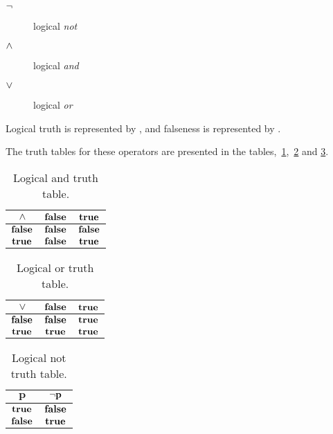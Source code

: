 \begin{description}
\item[$\neg$] logical \textit{not}
\item[$\wedge$] logical \textit{and}
\item[$\vee$] logical \textit{or}
\end{description}

Logical truth is represented by \True, and falseness is represented by
\False.

The truth tables for these operators are presented in the
tables,~\ref{tab:log-and-table},~\ref{tab:log-or-table} and
\ref{tab:log-not-table}.

\begin{table}
  \centering
  \begin{tabular}{|c|c|c|}
    \hline
    $\mathbf{\wedge}$ & $\mathbf{\textbf{false}}$ & $\mathbf{\textbf{true}}$ \\ \hline
    $\mathbf{\textbf{false}}$ & $\mathbf{\textbf{false}}$ & $\mathbf{\textbf{false}}$ \\ \hline
    $\mathbf{\textbf{true}}$ & $\mathbf{\textbf{false}}$ & $\mathbf{\textbf{true}}$ \\ \hline
  \end{tabular}
  \caption{Logical and truth table.}
  \label{tab:log-and-table}
\end{table}

\begin{table}
  \centering
  \begin{tabular}{|c|c|c|}
    \hline
    $\mathbf{\vee}$ & $\mathbf{\textbf{false}}$ & $\mathbf{\textbf{true}}$ \\ \hline
    $\mathbf{\textbf{false}}$ & $\textbf{false}$ & $\textbf{true}$ \\ \hline
    $\mathbf{\textbf{true}}$ & $\textbf{true}$ & $\textbf{true}$ \\ \hline
  \end{tabular}
  \caption{Logical or truth table.}
  \label{tab:log-or-table}
\end{table}

\begin{table}
  \centering
  \begin{tabular}{|c|c|}
    \hline
    $\mathbf{p}$ & $\mathbf{\neg p}$ \\ \hline
    $\textbf{true}$ & $\textbf{false}$ \\ \hline
    $\textbf{false}$ & $\textbf{true}$ \\ \hline
  \end{tabular}
  \caption{Logical not truth table.}
  \label{tab:log-not-table}
\end{table}

